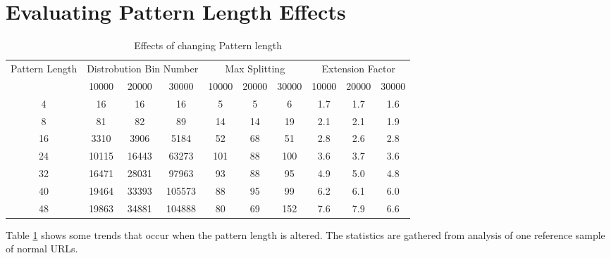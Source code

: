 \documentclass[ %
                    author={Samuel Russell},
                supervisor={Prof. Bogdan Warinschi},
                    degree={MEng},
                     title={Innocuous Ciphertexts},
                  subtitle={The DE-CENSOR Scheme},
                      type={research},
                      year={2018} ]{dissertation}
\begin{document}
\section{Evaluating Pattern Length Effects}\label{sec:gran}

\begin{table}[h]
\centering
\begin{tabular}{|c|c|c|c|c|c|c|c|c|c|}
\hline
\multirow{2}{*}{Pattern Length}&
\multicolumn{3}{|c|}{Distrobution Bin Number}&
\multicolumn{3}{|c|}{Max Splitting}&
\multicolumn{3}{|c|}{Extension Factor}\\
\cline{2-10}
&10000&20000&30000&10000&20000&30000&10000&20000&30000\\
\hline
4 	& 16&16&16 				& 5&5&6 		& 1.7&1.7&1.6\\
8 	& 81&82&89 				& 14&14&19		& 2.1&2.1&1.9\\
16 	& 3310&3906&5184 		& 52&68&51 		& 2.8&2.6&2.8\\
24 	& 10115&16443&63273 	& 101&88&100 	& 3.6&3.7&3.6\\
32 	& 16471&28031&97963 	& 93&88&95 		& 4.9&5.0&4.8\\
40 	& 19464&33393&105573 	& 88&95&99 		& 6.2&6.1&6.0\\
48 	& 19863&34881&104888 	& 80&69&152 	& 7.6&7.9&6.6\\
\hline
\end{tabular}
\caption{Effects of changing Pattern length}
\label{tab:patlen}
\end{table}

Table \ref{tab:patlen} shows some trends that occur when the pattern length is altered. The statistics are gathered from analysis of one reference sample of normal URLs.
\end{document}
